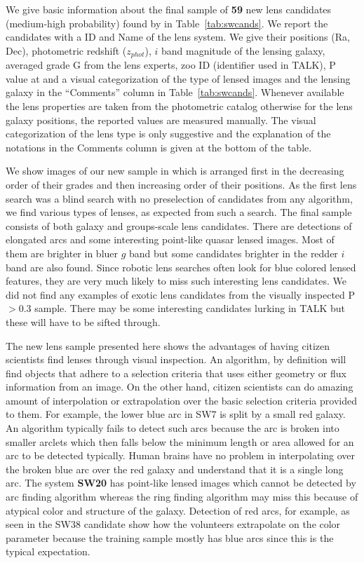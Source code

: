\documentclass[useAMS,usenatbib,a4paper]{mn2e}
\begin{document}
We give basic information about the final sample of {\bf 59} new lens
candidates (medium-high probability) found by \sw in
Table~\ref{tab:swcands}. We report the candidates with a \sw ID and Name
of the lens system. We give their positions (Ra, Dec), photometric
redshift ($z_{phot}$), $i$ band magnitude of the lensing galaxy,
averaged grade G from the lens experts, zoo ID (identifier used in
TALK), P value at \StageTwo and a visual categorization of the type of
lensed images and the lensing galaxy in the ``Comments'' column in
Table~\ref{tab:swcands}. Whenever available the lens properties are
taken from the \cfhtls photometric catalog \citep{Coupon2009} otherwise
for the lens galaxy positions, the reported values are measured
manually. The visual categorization of the lens type is only suggestive
and the explanation of the notations in the Comments column is given at
the bottom of the table.

We show images of our new sample in  which is arranged
first in the decreasing order of their grades and then increasing order
of their positions. As the first lens search was a blind search with no
preselection of candidates from any algorithm, we find various types of
lenses, as expected from such a search. The final sample consists of
both galaxy and groups-scale lens candidates. There are detections of
elongated arcs and some interesting point-like quasar lensed images.
Most of them are brighter in bluer $g$ band but some candidates brighter
in the redder $i$ band are also found. Since robotic lens searches often
look for blue colored lensed features, they are very much likely to miss
such interesting lens candidates. We did not find any examples of
exotic lens candidates from the visually inspected P$>0.3$ sample. There
may be some interesting candidates lurking in TALK but these will have
to be sifted through.

The new \sw lens sample presented here shows the advantages of having
citizen scientists find lenses through visual inspection. An algorithm,
by definition will find objects that adhere to a selection criteria that
uses either geometry or flux information from an image. On the other
hand, citizen scientists can do amazing amount of interpolation or
extrapolation over the basic selection criteria provided to them.  For
example, the lower blue arc in SW7 is split by a small red galaxy.  An
algorithm typically fails to detect such arcs because the arc is broken
into smaller arclets which then falls below the minimum length or area
allowed for an arc to be detected typically. Human brains have no
problem in interpolating over the broken blue arc over the red galaxy
and understand that it is a single long arc. The system {\bf SW20} has
point-like lensed images which cannot be detected by arc finding
algorithm whereas the ring finding algorithm may miss this because of
atypical color and structure of the galaxy. Detection of red arcs, for
example, as seen in the SW38 candidate show how the volunteers
extrapolate on the color parameter because the training sample mostly
has blue arcs since this is the typical expectation.
\end{document}
